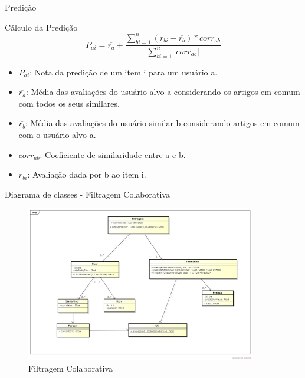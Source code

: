 \documentclass[xcolor=dvipsnames]{beamer}
\begin{document}
\begin{frame}{Predição}
	
	\begin{block}{Cálculo da Predição}	
		$$ 
	P_{ai} = \overline{r_a} + \frac{\sum_{bi=1}^n ( r_{bi} - \overline{r_b} ) * corr_{ab}}  {\sum_{bi=1}^n |corr_{ab}|}	
		$$
		
		\begin{itemize}
			\item $ \scriptstyle P_{ai}$: {\scriptsize Nota da predição de um item i para um usuário a.}
			\item $ \scriptstyle \overline{r_a}$: {\scriptsize Média das avaliações do usuário-alvo a considerando os artigos em comum com todos os seus similares.}

			\item $\scriptstyle \overline{r_b}$: {\scriptsize Média das avaliações do usuário similar b considerando artigos em comum com o usuário-alvo a. }
		
			\item $\scriptstyle corr_{ab}$: {\scriptsize Coeficiente de similaridade entre a e b. }
			\item $\scriptstyle r_{bi}$: {\scriptsize Avaliação dada por b ao item i.}

		\end{itemize}	
			
	\end{block}	

\end{frame}

\begin{frame}[fragile]{Diagrama de classes - Filtragem Colaborativa}
	
	\begin{figure}[!htb]
			\centering
			\includegraphics[keepaspectratio=true,height=6.8cm]{FiltragemColaborativa.png}
			\caption{Filtragem Colaborativa}
			\label{ArquiteturaSistema}
		\end{figure}		
\end{frame}
\end{document}
